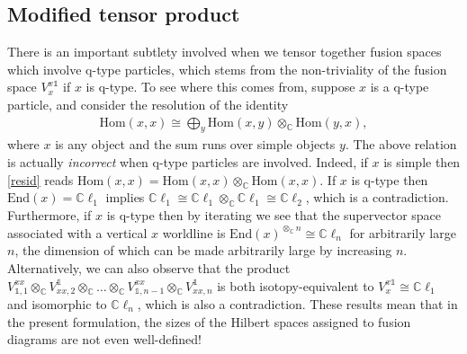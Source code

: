 \documentclass[12pt,a4paper]{article}
\newcommand{\tp}{\otimes}
\newcommand{\unit}{\mathds{1}}
\newcommand{\cc}{\mathbb{C}}
\newcommand{\Hom}{\text{Hom}}
\newcommand{\End}{\text{End}}
\newcommand{\cl}{\mathbb{C}\ell}
\begin{document}
\subsection{Modified tensor product} \label{modified_tensor_product}

There is an important subtlety involved when we tensor together fusion spaces which involve q-type particles, which stems from the non-triviality of the fusion space $V^{x\unit}_x$ if $x$ is q-type.
To see where this comes from, suppose $x$ is a q-type particle, and consider the resolution of the identity 
\begin{align} \label{resid}
\Hom(x,x) \cong \bigoplus_y \Hom(x,y) \tp_\cc \Hom(y,x),
\end{align}
where $x$ is any object and the sum runs over simple objects $y$. 
The above relation is actually {\it incorrect} when q-type particles are involved. 
Indeed, if $x$ is simple then \eqref{resid} reads $\Hom(x,x) = \Hom(x,x) \tp_\cc \Hom(x,x).$ 
If $x$ is q-type then $\End(x) = \cl_1$ implies $\cl_1 \cong \cl_1\tp_\cc \cl_1 \cong \cl_2$, which is a contradiction. 
Furthermore, if $x$ is q-type then by iterating we see that the supervector space associated with a vertical $x$ worldline is $\End(x)^{\tp_{\cc} n} \cong \cl_n$ for arbitrarily large $n$, the dimension of which can be made arbitrarily large by increasing $n$. 
Alternatively, we can also observe that the product $V_{\unit,1}^{xx} \tp_\cc V^\unit_{xx,2} \tp_\cc \dots \tp_\cc V_{\unit,n-1}^{xx} \tp_\cc V^\unit_{xx,n}$ is both isotopy-equivalent to $V^{x\unit}_x \cong \cl_1$ and isomorphic to $\cl_n$, which is also a contradiction. 
These results mean that in the present formulation, the sizes of the Hilbert spaces assigned to fusion diagrams are not even well-defined! 
\end{document}
